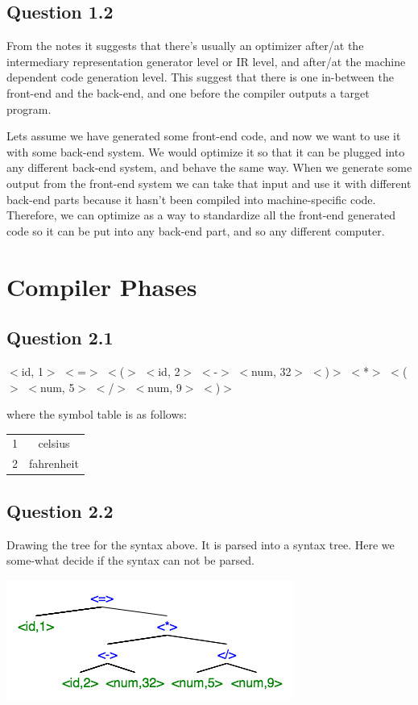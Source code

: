 \documentclass[11pt, oneside]{article}
\begin{document}
\newpage

\subsection{Question 1.2}
\par From the notes it suggests that there's usually an optimizer after/at the intermediary representation generator level or IR level, and after/at the machine dependent code generation level. This suggest that there is one in-between the front-end and the back-end, and one before the compiler outputs a target program.
\par Lets assume we have generated some front-end code, and now we want to use it with some back-end system. We would optimize it so that it can be plugged into any different back-end system, and behave the same way. When we generate some output from the front-end system we can take that input and use it with different back-end parts because it hasn't been compiled into machine-specific code. Therefore, we can optimize as a way to standardize all the front-end generated code so it can be put into any back-end part, and so any different computer.

\section{Compiler Phases}
\subsection{Question 2.1}
\par \small $<$id, 1$>$ $<$=$>$ $<$($>$ $<$id, 2$>$ $<$-$>$ $<$num, 32$>$ $<$)$>$ $<$*$>$ $<$($>$ $<$num, 5$>$ $<$/$>$ $<$num, 9$>$ $<$)$>$
\par where the symbol table is as follows: 
\par \begin{tabular}{ l | c }
  1  & celsius \\
  2 & fahrenheit \\
\end{tabular}

\subsection{Question 2.2}
\par Drawing the tree for the syntax above. It is parsed into a syntax tree. Here we some-what decide if the syntax can not be parsed.

\includegraphics[]{image1.png}
\end{document}
